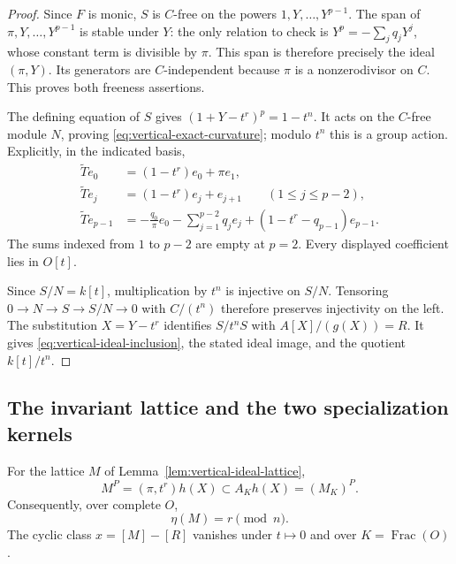 \begin{proof}
Since \(F\) is monic, \(S\) is \(C\)-free on the powers
\(1,Y,\ldots,Y^{p-1}\).
The span of \(\pi,Y,\ldots,Y^{p-1}\) is stable under \(Y\):
the only relation to check is \(Y^p=-\sum_jq_jY^j\), whose
constant term is divisible by \(\pi\).
This span is therefore precisely the ideal \((\pi,Y)\).
Its generators are \(C\)-independent because \(\pi\) is a
nonzerodivisor on \(C\).
This proves both freeness assertions.

The defining equation of \(S\) gives
\((1+Y-t^r)^p=1-t^n\).
It acts on the \(C\)-free module \(N\), proving
\eqref{eq:vertical-exact-curvature}; modulo \(t^n\) this is a
group action.  Explicitly, in the indicated basis,
\[
 \begin{split}
 \widetilde T e_0&=(1-t^r)e_0+\pi e_1,\\
 \widetilde T e_j&=(1-t^r)e_j+e_{j+1}
                       \qquad(1\le j\le p-2),\\
 \widetilde T e_{p-1}
   &=-\frac{q_0}{\pi}e_0
     -\sum_{j=1}^{p-2}q_j e_j
     +(1-t^r-q_{p-1})e_{p-1}.
 \end{split}
\]
The sums indexed from \(1\) to \(p-2\) are empty at \(p=2\).
Every displayed coefficient lies in \(O[t]\).

Since \(S/N=k[t]\), multiplication by \(t^n\) is injective
on \(S/N\).  Tensoring \(0\to N\to S\to S/N\to0\) with
\(C/(t^n)\) therefore preserves injectivity on the left.
The substitution \(X=Y-t^r\) identifies \(S/t^nS\) with
\(A[X]/(g(X))=R\).
It gives \eqref{eq:vertical-ideal-inclusion}, the stated ideal
image, and the quotient \(k[t]/t^n\).
\end{proof}

\subsection{The invariant lattice and the two specialization kernels}

\begin{lemma}\label{lem:vertical-invariant-volume}
For the lattice \(M\) of Lemma~\ref{lem:vertical-ideal-lattice},
\[
 M^P=(\pi,t^r)h(X)\subset A_Kh(X)=(M_K)^P.
\]
Consequently, over complete \(O\),
\begin{equation}\label{eq:vertical-index-value}
 \eta(M)=r\pmod n.
\end{equation}
The cyclic class \(x=[M]-[R]\) vanishes under \(t\mapsto0\)
and over \(K=\operatorname{Frac}(O)\).
\end{lemma}

